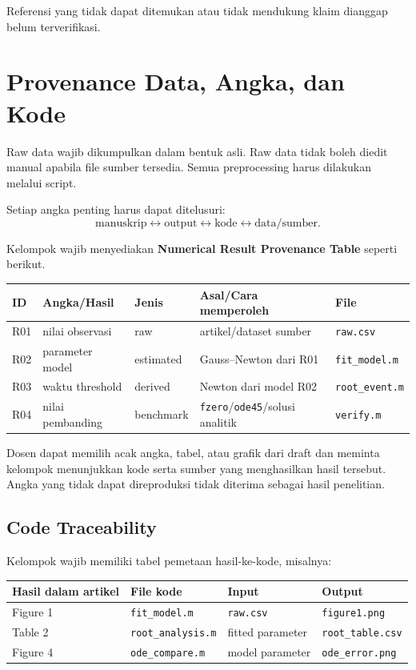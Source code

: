 \documentclass[11pt,a4paper]{article}
\begin{document}
Referensi yang tidak dapat ditemukan atau tidak mendukung klaim dianggap belum terverifikasi.

\section{Provenance Data, Angka, dan Kode}

Raw data wajib dikumpulkan dalam bentuk asli. Raw data tidak boleh diedit manual apabila file sumber tersedia. Semua preprocessing harus dilakukan melalui script.

Setiap angka penting harus dapat ditelusuri:
\[
\boxed{\text{manuskrip} \leftrightarrow \text{output} \leftrightarrow \text{kode} \leftrightarrow \text{data/sumber}.}
\]

Kelompok wajib menyediakan \textbf{Numerical Result Provenance Table} seperti berikut.

\begin{center}
\begin{tabularx}{\textwidth}{L{1cm} Y Y Y Y}
\toprule
\textbf{ID} & \textbf{Angka/Hasil} & \textbf{Jenis} & \textbf{Asal/Cara memperoleh} & \textbf{File} \\
\midrule
R01 & nilai observasi & raw & artikel/dataset sumber & \texttt{raw.csv} \\
R02 & parameter model & estimated & Gauss--Newton dari R01 & \texttt{fit\_model.m} \\
R03 & waktu threshold & derived & Newton dari model R02 & \texttt{root\_event.m} \\
R04 & nilai pembanding & benchmark & \texttt{fzero}/\texttt{ode45}/solusi analitik & \texttt{verify.m} \\
\bottomrule
\end{tabularx}
\end{center}

Dosen dapat memilih acak angka, tabel, atau grafik dari draft dan meminta kelompok menunjukkan kode serta sumber yang menghasilkan hasil tersebut. Angka yang tidak dapat direproduksi tidak diterima sebagai hasil penelitian.

\subsection{Code Traceability}

Kelompok wajib memiliki tabel pemetaan hasil-ke-kode, misalnya:

\begin{center}
\begin{tabularx}{\textwidth}{Y Y Y Y}
\toprule
\textbf{Hasil dalam artikel} & \textbf{File kode} & \textbf{Input} & \textbf{Output} \\
\midrule
Figure 1 & \texttt{fit\_model.m} & \texttt{raw.csv} & \texttt{figure1.png} \\
Table 2 & \texttt{root\_analysis.m} & fitted parameter & \texttt{root\_table.csv} \\
Figure 4 & \texttt{ode\_compare.m} & model parameter & \texttt{ode\_error.png} \\
\bottomrule
\end{tabularx}
\end{center}
\end{document}
